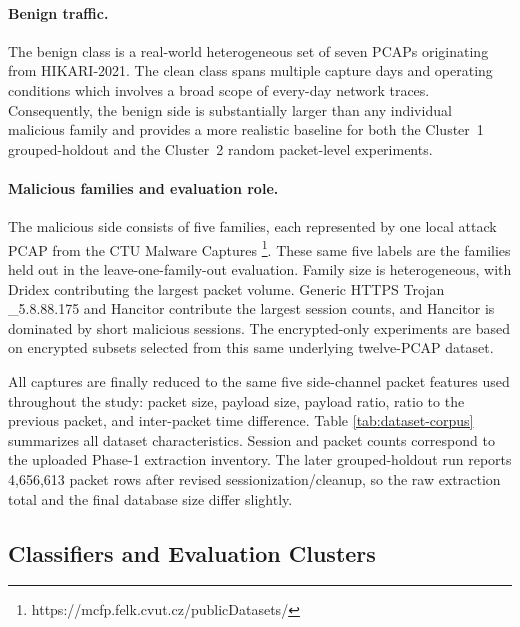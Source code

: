 \documentclass[conference]{IEEEtran}
\begin{document}
\paragraph{Benign traffic.}
The benign class is a real-world heterogeneous set of seven PCAPs originating from HIKARI-2021. The clean class spans multiple capture days and operating conditions which involves a broad scope of every-day network traces. Consequently, the benign side is substantially larger than any individual malicious family and provides a more realistic baseline for both the Cluster~1 grouped-holdout and the Cluster~2 random packet-level experiments.

\paragraph{Malicious families and evaluation role.}
The malicious side consists of five families, each represented by one local attack PCAP from the CTU Malware Captures \footnote{https://mcfp.felk.cvut.cz/publicDatasets/}. These same five labels are the families held out in the leave-one-family-out evaluation. Family size is heterogeneous, with Dridex contributing the largest packet volume. Generic HTTPS Trojan \_5.8.88.175 and Hancitor contribute the largest session counts, and Hancitor is dominated by short malicious sessions. The encrypted-only experiments are based on encrypted subsets selected from this same underlying twelve-PCAP dataset. 

All captures are finally reduced to the same five side-channel packet features used throughout the study: packet size, payload size, payload ratio, ratio to the previous packet, and inter-packet time difference. Table \ref{tab:dataset-corpus} summarizes all dataset characteristics. Session and packet counts correspond to the uploaded Phase-1 extraction inventory. The later grouped-holdout run reports 4{,}656{,}613 packet rows after revised sessionization/cleanup, so the raw extraction total and the final database size differ slightly.

\subsection{Classifiers and Evaluation Clusters}
\end{document}
